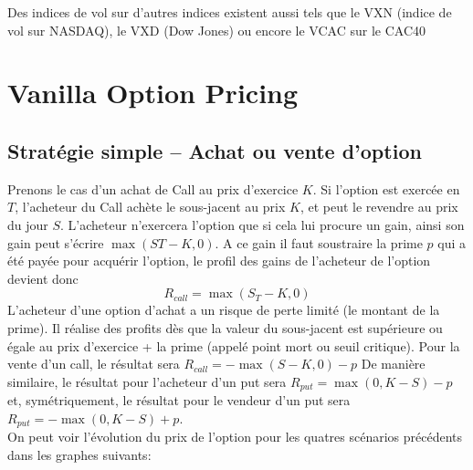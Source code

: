 \documentclass[a4paper]{article}
\begin{document}
Des indices de vol sur d'autres indices existent aussi tels que le VXN (indice de vol sur NASDAQ), le VXD (Dow Jones) ou encore le VCAC sur le CAC40

\section{Vanilla Option Pricing}

\subsection{Stratégie simple -- Achat ou vente d'option}
Prenons le cas d’un achat de Call au prix d’exercice $K$. Si l’option est
exercée en $T$, l’acheteur du Call achète le sous-jacent au prix $K$, et peut
le revendre au prix du jour $S$. L’acheteur n’exercera l’option que si cela lui
procure un gain, ainsi son gain peut s’écrire $\max (ST−K, 0)$. A ce gain il faut soustraire la prime $p$ qui a été payée pour acquérir l’option, le profil des gains de l’acheteur de l’option devient donc \\
\begin{equation}
    R_{call} = \max (S_T-K, 0) 
\end{equation}
L’acheteur d’une option d’achat a un risque de perte limité (le montant de la prime). Il réalise des profits dès que la valeur du sous-jacent est supérieure ou égale au prix d’exercice + la prime (appelé point mort ou seuil critique). Pour la vente d'un call, le résultat sera $R_{call} = -\max (S-K, 0)-p$
\vspace{2mm}
De manière similaire, le résultat pour l'acheteur d'un put sera $R_{put}=\max (0,K-S)-p$ et, symétriquement, le résultat pour le vendeur d'un put sera $R_{put}=-\max (0,K-S)+p$.
\vspace{2mm} \\
On peut voir l'évolution du prix de l'option pour les quatres scénarios précédents dans les graphes suivants: \\
\end{document}
